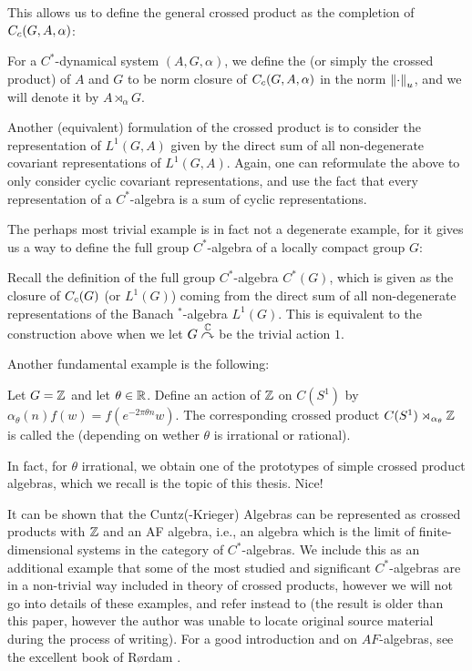 This allows us to define the general crossed product as the completion of $C_c(G,A,\alpha)$:
\begin{definition}
For a $C^*$-dynamical system $(A,G,\alpha)$, we define the  (or simply the crossed product) of $A$ and $G$ to be norm closure of $C_c(G,A,\alpha)$ in the norm $\left\lVert \cdot \right\rVert_u$, and we will denote it by $A \rtimes_\alpha G$.
\end{definition}
\begin{remark}
Another (equivalent) formulation of the crossed product is to consider the representation of $L^1(G,A)$ given by the direct sum of all non-degenerate covariant representations of $L^1(G,A)$. Again, one can reformulate the above to only consider cyclic covariant representations, and use the fact that every representation of a $C^*$-algebra is a sum of cyclic representations.
\end{remark}
The perhaps most trivial example is in fact not a degenerate example, for it gives us a way to define the full group $C^*$-algebra of a locally compact group $G$:
\begin{example}
Recall the definition of the full group $C^*$-algebra $C^*(G)$, which is given as the closure of $C_c(G)$ (or $L^1(G)$) coming from the direct sum of all non-degenerate representations of the Banach $^*$-algebra $L^1(G)$. This is equivalent to the construction above when we let $G \stackrel{\mathbb{C}}{\curvearrowright}$ be the trivial action $1$. 
\end{example}
Another fundamental example is the following:
\begin{example}
Let $G = \mathbb{Z}$ and let $\theta \in \mathbb{R}$. Define an action of $\mathbb{Z}$ on $C(S^1)$ by $\alpha_\theta(n)f(w) = f(e^{-2\pi \theta n} w)$. The corresponding crossed product $C(S^1) \rtimes_{\alpha_\theta} \mathbb{Z}$ is called the  (depending on wether $\theta$ is irrational or rational).
\end{example}
In fact, for $\theta$ irrational, we obtain one of the prototypes of simple crossed product algebras, which we recall is the topic of this thesis. Nice!
\begin{example}
	It can be shown that the Cuntz(-Krieger) Algebras can be represented as crossed products with $\mathbb{Z}$ and an AF algebra, i.e., an algebra which is the limit of finite-dimensional systems in the category of $C^*$-algebras. We include this as an additional example that some of the most studied and significant $C^*$-algebras are in a non-trivial way included in theory of crossed products, however we will not go into details of these examples, and refer instead to \cite{aukhadiev2014crossed} (the result is older than this paper, however the author was unable to locate original source material during the process of writing). For a good introduction and on $AF$-algebras, see the excellent book of Rørdam \cite[Chapter 5]{rordam2000introduction}.
\end{example}

